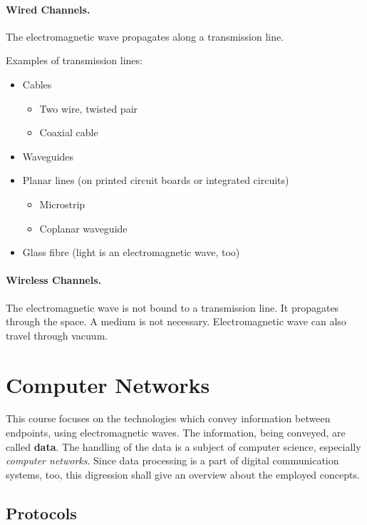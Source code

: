 \paragraph{Wired Channels.}

The electromagnetic wave propagates along a transmission line.

Examples of transmission lines:
\begin{itemize}
	\item Cables
	\begin{itemize}
		\item Two wire, twisted pair
		\item Coaxial cable
	\end{itemize}
	\item Waveguides
	\item Planar lines (on printed circuit boards or integrated circuits)
	\begin{itemize}
		\item Microstrip
		\item Coplanar waveguide
	\end{itemize}
	\item Glass fibre (light is an electromagnetic wave, too)
\end{itemize}

\paragraph{Wireless Channels.}

The electromagnetic wave is not bound to a transmission line. It propagates through the space. A medium is not necessary. Electromagnetic wave can also travel through vacuum.


\section{Computer Networks}


This course focuses on the technologies which convey information between endpoints, using electromagnetic waves. The information, being conveyed, are called \textbf{data}. The handling of the data is a subject of computer science, especially \emph{computer networks}. Since data processing is a part of digital communication systems, too, this digression shall give an overview about the employed concepts.


\subsection{Protocols}

